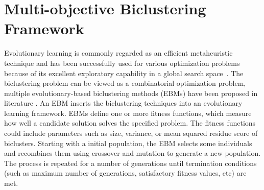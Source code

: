 \section{Multi-objective Biclustering Framework}
\label{sec:framework}

Evolutionary learning is commonly regarded as an efficient metaheuristic technique and has been successfully used for various optimization problems because of its excellent exploratory capability in a global search space~\cite{huang2012parallelized}.
The biclustering problem can be viewed as a combinatorial optimization problem, multiple evolutionary-based biclustering methods (EBMs) have been proposed in literature \cite{pontes2013configurable,huang2012parallelized,gallo2009bihea}.
An EBM inserts the biclustering techniques into an evolutionary learning framework. EBMs define one or more fitness functions, which measure how well a candidate solution solves the specified problem. The fitness functions could include parameters such as size, variance, or mean squared residue score of biclusters. 
Starting with a initial population, the EBM selects some individuals and recombines them using crossover and mutation to generate a new population.
The process is repeated for a number of generations until termination conditions (such as maximum number of generations, satisfactory fitness values, etc) are met.



